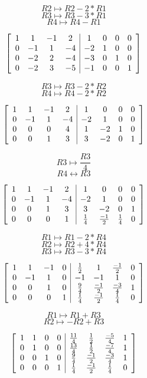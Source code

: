 \documentclass[lineaire_algebra_oplossingen.tex]{subfiles}
\begin{document}
\[R2 \mapsto R2 - 2*R1 \]
\[R3 \mapsto R3 - 3*R1 \]
\[R4 \mapsto R4 - R1 \]

\[
\left[
\begin{array}{ c c c c | c c c c }
1 & 1 & -1 & 2 & 1 & 0 & 0 & 0\\
0 & -1 & 1 & -4 & -2 & 1 & 0 & 0\\
0 & -2 & 2 & -4 & -3 & 0 & 1 & 0\\
0 & -2 & 3 & -5 & -1 & 0 & 0 & 1
\end{array}
\right]
\]

\[R3 \mapsto R3 - 2*R2 \]
\[R4 \mapsto R4 - 2*R2 \]

\[
\left[
\begin{array}{ c c c c | c c c c }
1 & 1 & -1 & 2 & 1 & 0 & 0 & 0\\
0 & -1 & 1 & -4 & -2 & 1 & 0 & 0\\
0 & 0 & 0 & 4 & 1 & -2 & 1 & 0\\
0 & 0 & 1 & 3 & 3 & -2 & 0 & 1
\end{array}
\right]
\]

\[R3 \mapsto \frac{R3}{4} \]
\[R4 \leftrightarrow R3 \]

\[
\left[
\begin{array}{ c c c c | c c c c }
1 & 1 & -1 & 2 & 1 & 0 & 0 & 0\\
0 & -1 & 1 & -4 & -2 & 1 & 0 & 0\\
0 & 0 & 1 & 3 & 3 & -2 & 0 & 1\\
0 & 0 & 0 & 1 & \frac{1}{4} & \frac{-1}{2} & \frac{1}{4} & 0
\end{array}
\right]
\]

\[R1 \mapsto R1 - 2*R4 \]
\[R2 \mapsto R2 + 4*R4 \]
\[R3 \mapsto R3 - 3*R4 \]

\[
\left[
\begin{array}{ c c c c | c c c c }
1 & 1 & -1 & 0 & \frac{1}{2} & 1 & \frac{-1}{2} & 0\\
0 & -1 & 1 & 0 & -1 & -1 & 1 & 0\\
0 & 0 & 1 & 0 & \frac{9}{4} & \frac{-1}{2} & \frac{-3}{4} & 1\\
0 & 0 & 0 & 1 & \frac{1}{4} & \frac{-1}{2} & \frac{1}{4} & 0
\end{array}
\right]
\]

\[R1 \mapsto R1 + R3 \]
\[R2 \mapsto -R2 + R3 \]

\[
\left[
\begin{array}{ c c c c | c c c c }
1 & 1 & 0 & 0 & \frac{11}{4} & \frac{1}{2} & \frac{-5}{4} & 1\\
0 & 1 & 0 & 0 & \frac{13}{4} & \frac{1}{2} & \frac{-7}{4} & 1\\
0 & 0 & 1 & 0 & \frac{9}{4} & \frac{-1}{2} & \frac{-3}{4} & 1\\
0 & 0 & 0 & 1 & \frac{1}{4} & \frac{-1}{2} & \frac{1}{4} & 0
\end{array}
\right]
\]
\end{document}
